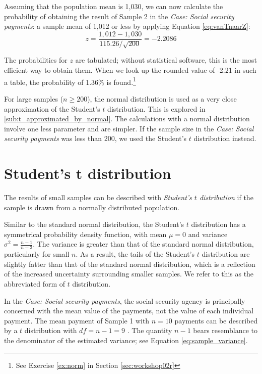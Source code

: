 \bigskip
Assuming that the population mean is 1,030, we can now calculate the probability of obtaining the result of Sample 2 in the \emph{Case: Social security payments}: a sample mean of 1,012 or less by applying Equation \ref{eq:vanTnaarZ}:
\begin{equation*}
z = \frac{1,012 - 1,030}{115.26 / \sqrt{200}} = -2.2086
\end{equation*}

The probabilities for $z$ are tabulated; without statistical software, this is the most efficient way to obtain them. When we look up the rounded value of -2.21 in such a table, the probability of 1.36\% is found.\footnote{See Exercise \ref{ex:norm} in Section \ref{sec:workshop02r}}

For large samples ($n \geq 200$), the normal distribution is used as a very close approximation of the Student's $t$ distribution. This is explored in \ref{sub:t_approximated_by_normal}. The calculations with a normal distribution involve one less parameter and are simpler. If the sample size in the \emph{Case: Social security payments} was less than 200, we used the Student's $t$ distribution instead.


\section{Student's t distribution} %
\label{sec:student_t_distribution}

The results of small samples can be described with \emph{Student's $t$ distribution} if the sample is drawn from a normally distributed population.

Similar to the standard normal distribution, the Student's $t$ distribution has a symmetrical probability density function, with mean $\mu = 0$ and variance $\sigma^2 = \frac{n - 1}{n - 3}$. The variance is greater than that of the standard normal distribution, particularly for small $n$. As a result, the tails of the Student's $t$ distribution are slightly fatter than that of the standard normal distribution, which is a reflection of the increased uncertainty surrounding smaller samples. We refer to this as the abbreviated form of $t$ distribution.

In the \emph{Case: Social security payments}, the social security agency is principally concerned with the mean value of the payments, not the value of each individual payment. The mean payment of Sample 1 with $n = 10$ payments can be described by a $t$ distribution with $df = n - 1 = 9$ . The quantity $n - 1$ bears resemblance to the denominator of the estimated variance; see Equation \ref{eq:sample_variance}.

